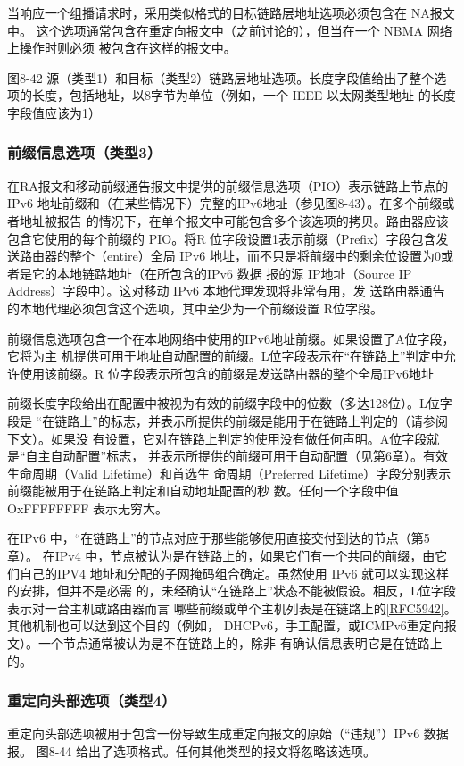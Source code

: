 当响应一个组播请求时，采用类似格式的目标链路层地址选项必须包含在 NA报文中。
这个选项通常包含在重定向报文中（之前讨论的），但当在一个 NBMA 网络上操作时则必须
被包含在这样的报文中。

图8-42 源（类型1）和目标（类型2）链路层地址选项。长度字段值给出了整个选
项的长度，包括地址，以8字节为单位（例如，一个 IEEE 以太网类型地址
的长度字段值应该为1）

\subsubsection{前缀信息选项（类型3）}
在RA报文和移动前缀通告报文中提供的前缀信息选项（PIO）表示链路上节点的IPv6
地址前缀和（在某些情况下）完整的IPv6地址（参见图8-43）。在多个前缀或者地址被报告
的情况下，在单个报文中可能包含多个该选项的拷贝。路由器应该包含它使用的每个前缀的
PIO。将R 位字段设置1表示前缀（Prefix）字段包含发送路由器的整个（entire）全局 IPv6
地址，而不只是将前缀中的剩余位设置为0或者是它的本地链路地址（在所包含的IPv6 数据
报的源 IP地址（Source IP Address）字段中）。这对移动 IPv6 本地代理发现将非常有用，发
送路由器通告的本地代理必须包含这个选项，其中至少为一个前缀设置 R位字段。

前缀信息选项包含一个在本地网络中使用的IPv6地址前缀。如果设置了A位字段，它将为主
机提供可用于地址自动配置的前缀。L位字段表示在“在链路上”判定中允许使用该前缀。R
位字段表示所包含的前缀是发送路由器的整个全局IPv6地址

前缀长度字段给出在配置中被视为有效的前缀字段中的位数（多达128位）。L位字段是
“在链路上”的标志，并表示所提供的前缀是能用于在链路上判定的（请参阅下文）。如果没
有设置，它对在链路上判定的使用没有做任何声明。A位字段就是“自主自动配置”标志，
并表示所提供的前缀可用于自动配置（见第6章）。有效生命周期（Valid Lifetime）和首选生
命周期（Preferred Lifetime）字段分别表示前缀能被用于在链路上判定和自动地址配置的秒
数。任何一个字段中值 OxFFFFFFFF 表示无穷大。

在IPv6 中，“在链路上”的节点对应于那些能够使用直接交付到达的节点（第5章）。
在IPv4 中，节点被认为是在链路上的，如果它们有一个共同的前缀，由它们自己的IPV4
地址和分配的子网掩码组合确定。虽然使用 IPv6 就可以实现这样的安排，但并不是必需
的，未经确认“在链路上”状态不能被假设。相反，L位字段表示对一台主机或路由器而言
哪些前缀或单个主机列表是在链路上的\href{https://www.rfc-editor.org/rfc/rfc5942}{[RFC5942]}。其他机制也可以达到这个目的（例如，
DHCPv6，手工配置，或ICMPv6重定向报文）。一个节点通常被认为是不在链路上的，除非
有确认信息表明它是在链路上的。

\subsubsection{重定向头部选项（类型4）}
重定向头部选项被用于包含一份导致生成重定向报文的原始（“违规”）IPv6 数据报。
图8-44 给出了选项格式。任何其他类型的报文将忽略该选项。

